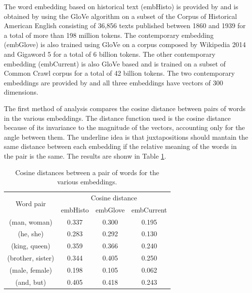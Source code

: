 \documentclass[runningheads]{llncs}
\begin{document}
The word embedding based on historical text (embHisto) is provided by \cite{histo} and is obtained by using the GloVe algorithm on a subset of the Corpus of Historical American English consisting of 36,856 texts published between 1860 and 1939 for a total of more than 198 million tokens. The contemporary embedding (embGlove) is also trained using GloVe on a corpus composed by Wikipedia 2014 and Gigaword 5 for a total of 6 billion tokens. The other contemporary embedding (embCurrent) is also GloVe based and is trained on a subset of Common Crawl corpus for a total of 42 billion tokens. The two contemporary embeddings are provided by \cite{glove} and all three embeddings have vectors of 300 dimensions.

The first method of analysis compares the cosine distance between pairs of words in the various embeddings. The distance function used is the cosine distance because of its invariance to the magnitude of the vectors, accounting only for the angle between them. The underline idea is that juxtapositions should mantain the same distance between each embedding if the relative meaning of the words in the pair is the same. The results are shonw in Table \ref{tab:juxtapos}.

\begin{table}
\centering
\caption{Cosine distances between a pair of words for the various embeddings.}
\label{tab:juxtapos}
\begin{tabular}{|c|c|c|c|}
\hline
\multirow{2}{*}{Word pair} & \multicolumn{3}{|c|}{Cosine distance}\\\cline{2-4}
&embHisto&embGlove&embCurrent\\
\hline
(man, woman) &  0.337 & 0.300 & 0.195\\
(he, she) & 0.283 & 0.292 & 0.130\\
(king, queen) & 0.359 & 0.366 & 0.240\\
(brother, sister) & 0.344 & 0.405 & 0.250\\
(male, female) & 0.198 & 0.105 & 0.062\\
(and, but) & 0.405 & 0.418 & 0.243\\
\hline
\end{tabular}
\end{table}
\end{document}
